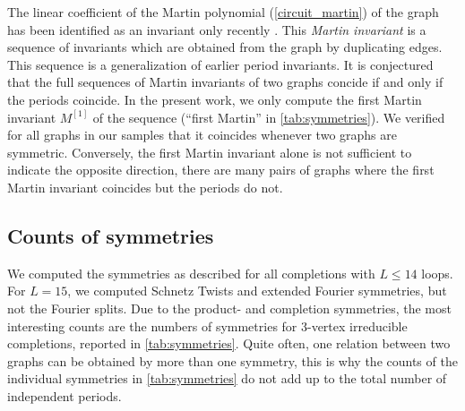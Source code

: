 \documentclass[11pt,a4paper]{article}
\renewcommand{\|}{\rule[-0.4ex]{0.2ex}{1.2em}}
\begin{document}
The linear coefficient of the Martin polynomial (\cref{circuit_martin}) of the graph has been identified as an invariant only recently  \cite{panzer_feynman_2023}. This \emph{Martin invariant} is a sequence of invariants which are obtained from the graph by duplicating edges. This sequence is a generalization of earlier period invariants. It is conjectured \cite{panzer_feynman_2023} that the full sequences of Martin invariants  of two graphs concide if and only if the periods coincide. In the present work, we only compute  the first Martin invariant $M^{[1]}$ of the sequence (\enquote{first Martin} in \cref{tab:symmetries}). We verified for all graphs in our samples that it coincides whenever two graphs are symmetric. Conversely, the first Martin invariant alone is not sufficient to indicate the opposite direction, there are many pairs of graphs where the first Martin invariant coincides but the periods do not.  





\subsection{Counts of symmetries}\label{sec:symmetries_count}

We computed the symmetries as described for all completions with $L \leq 14$ loops. For $L=15$, we computed Schnetz Twists and extended Fourier symmetries, but not the Fourier splits. Due to the product- and completion symmetries, the most interesting counts are the numbers of symmetries for 3-vertex irreducible completions, reported in \cref{tab:symmetries}. Quite often, one relation between two graphs can be obtained by more than one symmetry, this is why the counts of the individual symmetries in \cref{tab:symmetries} do not add up to the total number of independent periods.
\end{document}
